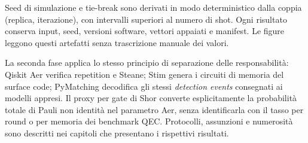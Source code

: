 \begin{onehalfspace}
Seed di simulazione e tie-break sono derivati in modo deterministico dalla
coppia (replica, iterazione), con intervalli superiori al numero di shot.
Ogni risultato conserva input, seed, versioni software, vettori appaiati e
manifest. Le figure leggono questi artefatti senza trascrizione manuale dei
valori.

La seconda fase applica lo stesso principio di separazione delle
responsabilità: Qiskit Aer verifica repetition e Steane; Stim genera i
circuiti di memoria del surface code; PyMatching decodifica gli stessi
\emph{detection events} consegnati ai modelli appresi. Il proxy per gate di
Shor converte esplicitamente la probabilità totale di Pauli non identità
nel parametro Aer, senza identificarla con il tasso per round o per memoria
dei benchmark QEC. Protocolli, assunzioni e numerosità sono descritti nei
capitoli che presentano i rispettivi risultati.

\end{onehalfspace}
